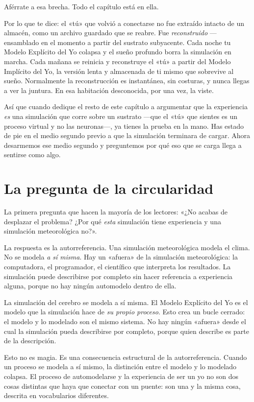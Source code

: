 \documentclass[11pt, twoside, openright]{book}
\begin{document}
Aférrate a esa brecha. Todo el capítulo está en ella.

Por lo que te dice: el «tú» que volvió a conectarse no fue extraído intacto de un almacén, como un archivo guardado que se reabre. Fue \textit{reconstruido} ---ensamblado en el momento a partir del sustrato subyacente. Cada noche tu Modelo Explícito del Yo colapsa y el sueño profundo borra la simulación en marcha. Cada mañana se reinicia y reconstruye el «tú» a partir del Modelo Implícito del Yo, la versión lenta y almacenada de ti mismo que sobrevive al sueño. Normalmente la reconstrucción es instantánea, sin costuras, y nunca llegas a ver la juntura. En esa habitación desconocida, por una vez, la viste.

Así que cuando dedique el resto de este capítulo a argumentar que la experiencia \textit{es} una simulación que corre sobre un sustrato ---que el «tú» que sientes es un proceso virtual y no las neuronas---, ya tienes la prueba en la mano. Has estado de pie en el medio segundo previo a que la simulación terminara de cargar. Ahora desarmemos ese medio segundo y preguntemos por qué eso que se carga llega a sentirse como algo.

\section*{La pregunta de la circularidad}

La primera pregunta que hacen la mayoría de los lectores: «¿No acabas de desplazar el problema? ¿Por qué \textit{esta} simulación tiene experiencia y una simulación meteorológica no?».

La respuesta es la autorreferencia. Una simulación meteorológica modela el clima. No se modela \textit{a sí misma}. Hay un «afuera» de la simulación meteorológica: la computadora, el programador, el científico que interpreta los resultados. La simulación puede describirse por completo sin hacer referencia a experiencia alguna, porque no hay ningún automodelo dentro de ella.

La simulación del cerebro se modela a sí misma. El Modelo Explícito del Yo es el modelo que la simulación hace de \textit{su propio proceso}. Esto crea un bucle cerrado: el modelo y lo modelado son el mismo sistema. No hay ningún «afuera» desde el cual la simulación pueda describirse por completo, porque quien describe es parte de la descripción.

Esto no es magia. Es una consecuencia estructural de la autorreferencia. Cuando un proceso se modela a sí mismo, la distinción entre el modelo y lo modelado colapsa. El proceso de automodelarse y la experiencia de ser un yo no son dos cosas distintas que haya que conectar con un puente: son una y la misma cosa, descrita en vocabularios diferentes.
\end{document}
